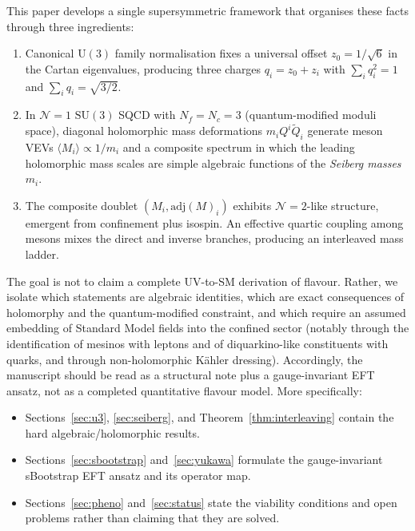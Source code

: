 \documentclass[11pt,a4paper]{article}
\newcommand{\SU}{\mathrm{SU}}
\newcommand{\UU}{\mathrm{U}}
\newcommand{\Nf}{N_f}
\newcommand{\Nc}{N_c}
\newcommand{\adj}{\mathrm{adj}}
\begin{document}
This paper develops a single supersymmetric framework that organises these
facts through three ingredients:
\begin{enumerate}
  \item Canonical $\UU(3)$ family normalisation fixes a universal offset
    $z_0=1/\sqrt6$ in the Cartan eigenvalues, producing three charges
    $q_i=z_0+z_i$ with $\sum_i q_i^2=1$ and $\sum_i q_i=\sqrt{3/2}$.
  \item In $\mathcal{N}{=}1$ $\SU(3)$ SQCD with $\Nf=\Nc=3$ (quantum-modified
    moduli space),
    diagonal holomorphic mass deformations $m_i Q^i\tilde Q_i$ generate
    meson VEVs $\langle M_i\rangle\propto 1/m_i$ and a composite spectrum
    in which the leading holomorphic mass scales are simple algebraic functions of the
    \emph{Seiberg masses} $m_i$.
  \item The composite doublet $(M_i, \adj(M)_i)$ exhibits
    $\mathcal{N}{=}2$-like structure, emergent from confinement
    plus isospin.  An effective quartic coupling among mesons
    mixes the direct and inverse branches, producing an interleaved
    mass ladder.
\end{enumerate}

The goal is not to claim a complete UV-to-SM derivation of flavour.
Rather, we isolate which statements are algebraic identities, which are
exact consequences of holomorphy and the quantum-modified constraint, and which
require an assumed embedding of Standard Model fields into the confined sector
(notably through the identification of mesinos with leptons and of
diquarkino-like constituents with quarks, and through non-holomorphic K\"ahler
dressing).
Accordingly, the manuscript should be read as a structural note plus a
gauge-invariant EFT ansatz, not as a completed quantitative flavour model.
More specifically:
\begin{itemize}
  \item Sections~\ref{sec:u3}, \ref{sec:seiberg}, and
    Theorem~\ref{thm:interleaving} contain the hard algebraic/holomorphic
    results.
  \item Sections~\ref{sec:sbootstrap} and~\ref{sec:yukawa} formulate the
    gauge-invariant sBootstrap EFT ansatz and its operator map.
  \item Sections~\ref{sec:pheno} and~\ref{sec:status} state the viability
    conditions and open problems rather than claiming that they are solved.
\end{itemize}
\end{document}

